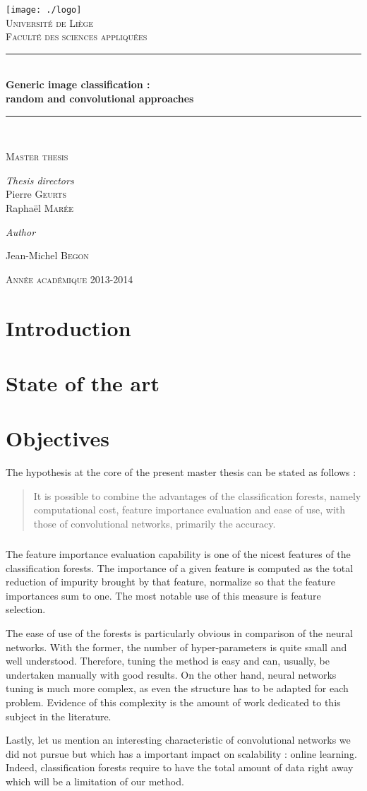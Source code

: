 \documentclass[a4paper]{report}
\newlength{\larg}
\newcommand{\titleg}{
  \begin{titlepage}
  \begin{center}

  \bigskip
  \bigskip
  \bigskip
  \bigskip 
  \bigskip


  \texttt{[image: ./logo]}\\[1cm]
  \smallskip
  \textsc{\LARGE Université de Liège}\\
  \smallskip
  \textsc{Faculté des sciences appliquées}\\

  \bigskip



  \rule{\columnwidth}{1pt} \\[0.4cm] 
  { \huge \bfseries Generic image classification : \\ \bigskip random and convolutional approaches}\\[0.4cm]
  \rule{\columnwidth}{1pt} \\[0.2cm]



  \begin{minipage}{0.7\textwidth} 
  \begin{center} \large 
  \textsc{Master thesis}
  \end{center} \end{minipage}

  \vfill


  \begin{minipage}{0.7\textwidth} \begin{center}
  \textit{Thesis directors} \\
  \large Pierre \textsc{Geurts} \\
  \large Raphaël \textsc{Marée} 
  \end{center} \end{minipage} 

  \bigskip
  \bigskip
  \bigskip

  \textit{Author} \\
  \begin{minipage}{0.7\textwidth} \begin{center}
  \large Jean-Michel \textsc{Begon}
  \end{center} \end{minipage} 
  


  \bigskip
  \bigskip
  \bigskip

  \textsc{Année académique 2013-2014}
  \end{center}
  \end{titlepage}
}
\begin{document}
\titleg
\thispagestyle{empty}
\newpage

\pagestyle{fancy}
\lhead{}
\chead{}
\rhead{\itshape \textcolor{gris}{Generic image classification}}
\lfoot{\itshape \textcolor{gris}{The RandConv framework}}
\cfoot{}
\rfoot{\itshape \textcolor{gris}{\thepage}}
\renewcommand{\headrulewidth}{0.4pt}
\renewcommand{\footrulewidth}{0.4pt}

\newpage 


\tableofcontents

\chapter{Introduction}

\chapter{State of the art}

\chapter{Objectives}
The hypothesis at the core of the present master thesis can be stated as follows : 
\begin{quote}
It is possible to combine the advantages of the classification forests, namely computational cost, feature importance evaluation and ease of use, with those of convolutional networks, primarily the accuracy.
\end{quote}
\paragraph{}
The feature importance evaluation capability is one of the nicest features of the classification forests. The importance of a given feature is computed as the total reduction of impurity brought by that feature, normalize so that the feature importances sum to one. The most notable use of this measure is feature selection. 
\par
The ease of use of the forests is particularly obvious in comparison of the neural networks. With the former, the number of hyper-parameters is quite small and well understood. Therefore, tuning the method is easy and can, usually, be undertaken manually with good results. On the other hand, neural networks tuning is much more complex, as even the structure has to be adapted for each problem. Evidence of this complexity is the amount of work dedicated to this subject in the literature. %
\par
Lastly, let us mention an interesting characteristic of convolutional networks we did not pursue but which has a important impact on scalability : online learning. Indeed, classification forests require to have the total amount of data right away which will be a limitation of our method.
\end{document}
